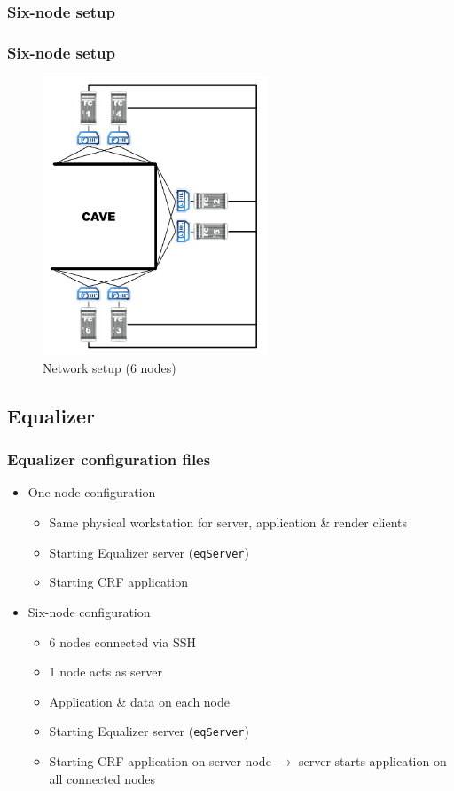 \subsubsection*{Six-node setup}
\begin{frame}\frametitle{Six-node setup}
	\begin{figure}
		\centering
	\includegraphics[width=0.6\textwidth]{../figures/6node_architecture}
	\caption{Network setup (6 nodes)}
	\end{figure}
\end{frame}

\subsection{Equalizer}
\begin{frame}\frametitle{Equalizer configuration files}
\begin{itemize}
	\item<1->One-node configuration
	\begin{itemize}
		\item Same physical workstation for server, application \& render clients
		\item Starting Equalizer server (\texttt{eqServer})
		\item Starting CRF application
	\end{itemize}
	\item<2->Six-node configuration
	\begin{itemize}
		\item 6 nodes connected via SSH
		\item 1 node acts as server
		\item Application \& data on each node
		\item Starting Equalizer server (\texttt{eqServer})
		\item Starting CRF application on server node $\rightarrow$ server starts application on all connected nodes
	\end{itemize}
\end{itemize}
\end{frame}

